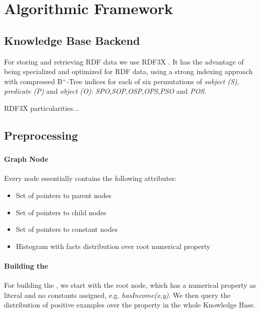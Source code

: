 \chapter{Algorithmic Framework}
\label{af:intro}

\section{Knowledge Base Backend}

For storing and retrieving RDF data we use RDF3X \cite{Neumann:2010:RES:1731351.1731354}. It has the advantage of being specialized and optimized for RDF data, using a strong indexing approach with compressed B$^+$-Tree indices for each of six permutations of \emph{subject (S)}, \emph{predicate (P)} and \emph{object (O)}: \emph{SPO},\emph{SOP},\emph{OSP},\emph{OPS},\emph{PSO} and \emph{POS}.

RDF3X particularities...

\section{Preprocessing}

\subsection{\graphname}

\subsubsection{Graph Node}

Every node essentially contains the following attributes:

\begin{itemize}
 \item Set of pointers to parent nodes
 \item Set of pointers to child nodes
 \item Set of pointers to constant nodes
 \item Histogram with facts distribution over root numerical property
\end{itemize}


\subsubsection{Building the \graphname}

For building the \graphname, we start with the root node, which has a numerical property as literal and no constants assigned, e.g. \emph{hasIncome(x,y)}. We then query the  distribution of positive examples over the property in the whole Knowledge Base.

